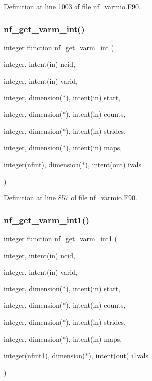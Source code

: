 Definition at line 1003 of file nf\+\_\+varmio.\+F90.

\mbox{\label{nf__varmio_8F90_a8ae5286478ed7650ccdd6a7835326b1e}} 
\subsubsection{\texorpdfstring{nf\+\_\+get\+\_\+varm\+\_\+int()}{nf\_get\_varm\_int()}}
{\footnotesize\ttfamily integer function nf\+\_\+get\+\_\+varm\+\_\+int (\begin{DoxyParamCaption}\item[{integer, intent(in)}]{ncid,  }\item[{integer, intent(in)}]{varid,  }\item[{integer, dimension($\ast$), intent(in)}]{start,  }\item[{integer, dimension($\ast$), intent(in)}]{counts,  }\item[{integer, dimension($\ast$), intent(in)}]{strides,  }\item[{integer, dimension($\ast$), intent(in)}]{maps,  }\item[{integer(nfint), dimension($\ast$), intent(out)}]{ivals }\end{DoxyParamCaption})}



Definition at line 857 of file nf\+\_\+varmio.\+F90.

\mbox{\label{nf__varmio_8F90_affd98434344ffcef76eb499e31ab2419}} 
\subsubsection{\texorpdfstring{nf\+\_\+get\+\_\+varm\+\_\+int1()}{nf\_get\_varm\_int1()}}
{\footnotesize\ttfamily integer function nf\+\_\+get\+\_\+varm\+\_\+int1 (\begin{DoxyParamCaption}\item[{integer, intent(in)}]{ncid,  }\item[{integer, intent(in)}]{varid,  }\item[{integer, dimension($\ast$), intent(in)}]{start,  }\item[{integer, dimension($\ast$), intent(in)}]{counts,  }\item[{integer, dimension($\ast$), intent(in)}]{strides,  }\item[{integer, dimension($\ast$), intent(in)}]{maps,  }\item[{integer(nfint1), dimension($\ast$), intent(out)}]{i1vals }\end{DoxyParamCaption})}



